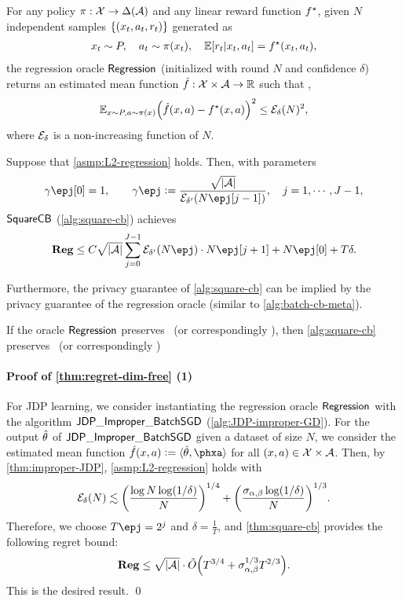 \begin{assumption}\label{asmp:L2-regression}
For any policy $\pi:\mathcal{X}\to \Delta(\mathcal{A})$ and any linear reward function $f^\star$, given $N$ independent samples $\left\{(x_t,a_t,r_t)\right\}$ generated as
\begin{align*}
    x_t\sim P,\quad
    a_t\sim \pi(x_t), \quad
    \mathbb{E}[r_t|x_t,a_t]=f^\star(x_t,a_t),
\end{align*}
the regression oracle $\mathsf{Regression}$ (initialized with round $N$ and confidence $\delta$) returns an estimated mean function $\hat{f}:\mathcal{X}\times\mathcal{A}\to\mathbb{R}$ such that \whp,
\begin{align*}
    \mathbb{E}_{x\sim P, a\sim \pi(x)} {\left( \hat{f}(x,a)-f^\star(x,a) \right)}^2\leq \mathcal{E}_{\delta}(N)^2,
\end{align*}
where $\mathcal{E}_\delta$ is a non-increasing function of $N$. 
\end{assumption}
\begin{theorem}\label{thm:square-cb}
Suppose that \cref{asmp:L2-regression} holds. Then, with parameters
\begin{align*}
    \gamma\epj[0]=1, \qquad \gamma\epj\defeq \frac{\sqrt{|\cA|}}{\cE_{\delta'}(N\epj[j-1])}, \quad j=1,\cdots,J-1,
\end{align*}
$\mathsf{SquareCB}$ (\cref{alg:square-cb}) achieves
\begin{align*}
    \Reg\leq C\sqrt{|\cA|}\sum_{j=0}^{J-1} \cE_{\delta'}(N\epj)\cdot N\epj[j+1]+N\epj[0]+T\delta.
\end{align*}
\end{theorem}

Furthermore, the privacy guarantee of \cref{alg:square-cb} can be implied by the privacy guarantee of the regression oracle (similar to \cref{alg:batch-cb-meta}).
\begin{lemma}
If the oracle $\mathsf{Regression}$ preserves \aJDP~(or correspondingly \aLDP), then \cref{alg:square-cb} preserves \aJDP~(or correspondingly \aLDP)
\end{lemma}

\paragraph{Proof of \cref{thm:regret-dim-free} (1)}
For JDP learning, we consider instantiating the regression oracle $\mathsf{Regression}$ with the algorithm $\mathsf{JDP\_Improper\_BatchSGD}$ (\cref{alg:JDP-improper-GD}). For the output $\hat{\theta}$ of $\mathsf{JDP\_Improper\_BatchSGD}$ given a dataset of size $N$, we consider the estimated mean function $\hf(x,a)\defeq \lr \hth,\phxa\rr$ for all $(x,a)\in\mathcal{X}\times\mathcal{A}$. Then, by \cref{thm:improper-JDP}, \cref{asmp:L2-regression} holds with 
\begin{align*}
    \mathcal{E}_\delta(N)\lesssim {\left( \frac{\log N \log(1/\delta)}{N} \right)}^{1/4}+{\left( \frac{\sigma_{\alpha,\beta}\log(1/\delta)}{N} \right)}^{1/3}.
\end{align*}
Therefore, we choose $T\epj=2^j$ and $\delta=\frac{1}{T}$, and \cref{thm:square-cb} provides the following regret bound:
\begin{align*}
    \mathbf{Reg}\leq \sqrt{|\mathcal{A}|}\cdot \tilde{O}{\left( T^{3/4}+\sigma_{\alpha,\beta}^{1/3}T^{2/3} \right)}.
\end{align*}
This is the desired result.
\qed


